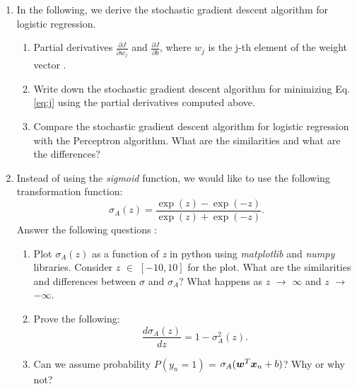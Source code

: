 \documentclass[11pt]{article}
\begin{document}
\begin{enumerate}

\item  In the following, we derive the stochastic gradient descent algorithm for logistic regression. 

\begin{enumerate}
    \item Partial derivatives $\frac{\partial J}{\partial w_j}$ and $\frac{\partial J}{\partial b}$, where $w_j$ is the j-th element of the weight vector . 
    
    \solution{}

    \item Write down the stochastic gradient descent algorithm for minimizing Eq. \eqref{eq:j} using the partial derivatives computed above. 
    
    \solution{}
    \item Compare the stochastic gradient descent algorithm for logistic regression with the Perceptron algorithm. What are the similarities and what are the differences? 
    
    \solution{}
\end{enumerate}


\item Instead of using the \textit{sigmoid} function, we would like to use the following transformation function:
\begin{equation*}
    \sigma_A(z) = \frac{\exp(z) - \exp(-z)}{\exp(z) + \exp(-z)}.
\end{equation*}
Answer the following questions :
\begin{enumerate}
\item Plot $\sigma_A(z)$ as a function of \textit{z} in python using \textit{matplotlib} and \textit{numpy} libraries. Consider $z$ $\in$ $[-10, 10]$ for the plot. 
What are the similarities and differences between $\sigma$ and $\sigma_A$? What happens as $z$ $\rightarrow$ $\infty$ and $z$ $\rightarrow$ $-\infty$. 

\solution{}

\item Prove the following: 
\begin{equation*}
    \frac{d\sigma_A(z)}{dz} = 1 - \sigma_{A}^{2}(z).
\end{equation*}

\solution{}

\item Can we assume probability $P(y_n = 1)$ = $\sigma_A(\boldsymbol{w}^T \boldsymbol{x}_n+b)$? Why or why not? 


\end{enumerate}
\end{enumerate}
\end{document}
